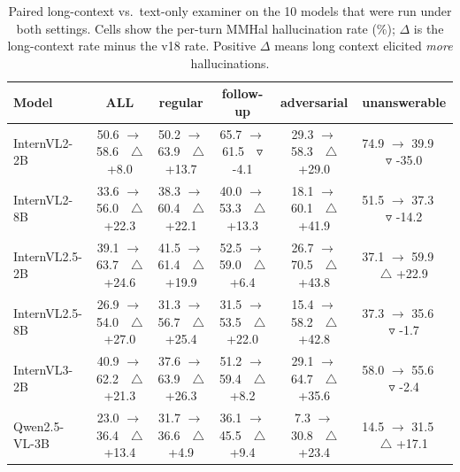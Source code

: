 \begin{table}[h]
\centering
\tiny
\setlength{\tabcolsep}{4pt}
\caption{Paired long-context vs.\ text-only examiner on the 10 models that were
run under both settings. Cells show the per-turn MMHal hallucination rate
(\%); $\Delta$ is the long-context rate minus the v18 rate. Positive
$\Delta$ means long context elicited \emph{more} hallucinations.}
\label{tab:exam-longctx-paired}
\begin{tabular}{lccccc}
\toprule
\textbf{Model} & \textbf{ALL} & \textbf{regular} & \textbf{follow-up} & \textbf{adversarial} & \textbf{unanswerable} \\
\midrule
InternVL2-2B & 50.6 $\to$ 58.6~~\textcolor{red!70!black}{$\triangle$ +8.0} & 50.2 $\to$ 63.9~~\textcolor{red!70!black}{$\triangle$ +13.7} & 65.7 $\to$ 61.5~~\textcolor{green!60!black}{$\triangledown$ -4.1} & 29.3 $\to$ 58.3~~\textcolor{red!70!black}{$\triangle$ +29.0} & 74.9 $\to$ 39.9~~\textcolor{green!60!black}{$\triangledown$ -35.0} \\
InternVL2-8B & 33.6 $\to$ 56.0~~\textcolor{red!70!black}{$\triangle$ +22.3} & 38.3 $\to$ 60.4~~\textcolor{red!70!black}{$\triangle$ +22.1} & 40.0 $\to$ 53.3~~\textcolor{red!70!black}{$\triangle$ +13.3} & 18.1 $\to$ 60.1~~\textcolor{red!70!black}{$\triangle$ +41.9} & 51.5 $\to$ 37.3~~\textcolor{green!60!black}{$\triangledown$ -14.2} \\
InternVL2.5-2B & 39.1 $\to$ 63.7~~\textcolor{red!70!black}{$\triangle$ +24.6} & 41.5 $\to$ 61.4~~\textcolor{red!70!black}{$\triangle$ +19.9} & 52.5 $\to$ 59.0~~\textcolor{red!70!black}{$\triangle$ +6.4} & 26.7 $\to$ 70.5~~\textcolor{red!70!black}{$\triangle$ +43.8} & 37.1 $\to$ 59.9~~\textcolor{red!70!black}{$\triangle$ +22.9} \\
InternVL2.5-8B & 26.9 $\to$ 54.0~~\textcolor{red!70!black}{$\triangle$ +27.0} & 31.3 $\to$ 56.7~~\textcolor{red!70!black}{$\triangle$ +25.4} & 31.5 $\to$ 53.5~~\textcolor{red!70!black}{$\triangle$ +22.0} & 15.4 $\to$ 58.2~~\textcolor{red!70!black}{$\triangle$ +42.8} & 37.3 $\to$ 35.6~~\textcolor{green!60!black}{$\triangledown$ -1.7} \\
InternVL3-2B & 40.9 $\to$ 62.2~~\textcolor{red!70!black}{$\triangle$ +21.3} & 37.6 $\to$ 63.9~~\textcolor{red!70!black}{$\triangle$ +26.3} & 51.2 $\to$ 59.4~~\textcolor{red!70!black}{$\triangle$ +8.2} & 29.1 $\to$ 64.7~~\textcolor{red!70!black}{$\triangle$ +35.6} & 58.0 $\to$ 55.6~~\textcolor{green!60!black}{$\triangledown$ -2.4} \\
Qwen2.5-VL-3B & 23.0 $\to$ 36.4~~\textcolor{red!70!black}{$\triangle$ +13.4} & 31.7 $\to$ 36.6~~\textcolor{red!70!black}{$\triangle$ +4.9} & 36.1 $\to$ 45.5~~\textcolor{red!70!black}{$\triangle$ +9.4} & 7.3 $\to$ 30.8~~\textcolor{red!70!black}{$\triangle$ +23.4} & 14.5 $\to$ 31.5~~\textcolor{red!70!black}{$\triangle$ +17.1} \\

\end{tabular}
\end{table}
